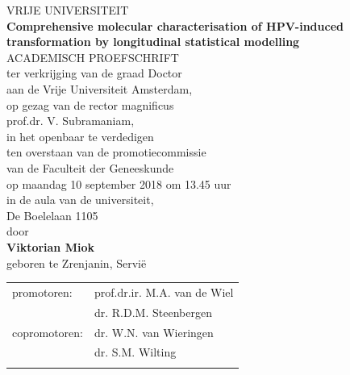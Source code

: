 \documentclass[notitlepage,twoside,10pt,openright,leqno]{Classes/PhDThesisPSnPDF} %
\begin{document}
\newpage
\begin{titlepage}
	\centering
	VRIJE UNIVERSITEIT\\
\vspace{2cm}
  {\bf\fontsize{16pt}{1em}\selectfont Comprehensive molecular characterisation of HPV-induced transformation by longitudinal statistical modelling\\}
  \vspace{2cm}
ACADEMISCH PROEFSCHRIFT\\
\vspace{1.5cm}
ter verkrijging van de graad Doctor \\
aan de Vrije Universiteit Amsterdam,\\
op gezag van de rector magnificus\\
prof.dr. V. Subramaniam,\\
in het openbaar te verdedigen\\
ten overstaan van de promotiecommissie\\
van de Faculteit der Geneeskunde\\
op maandag 10 september 2018 om 13.45 uur\\
in de aula van de universiteit,\\
De Boelelaan 1105\\
\vspace{1.5cm}
door\\
\vspace{1.5cm}
\textbf{Viktorian Miok}\\
\vspace{0.5cm}
geboren te Zrenjanin, Servi\"e\\
\end{titlepage}

\newpage
\thispagestyle{empty}

\newpage
\thispagestyle{empty}
\begin{tabular}{ll}
promotoren: & prof.dr.ir. M.A. van de Wiel\\
 & dr. R.D.M. Steenbergen \\
copromotoren: & dr. W.N. van Wieringen\\
 & dr. S.M. Wilting \\
\\ 
\end{tabular}


%
%

%
%
\end{document}
